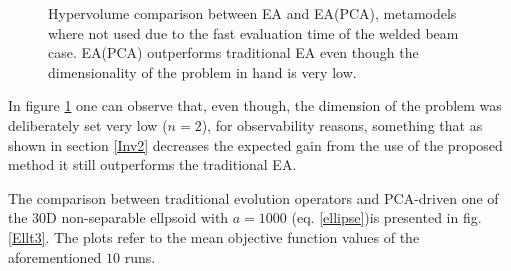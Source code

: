 \begin{figure}[h!]
\begin{minipage}[b]{1\linewidth}
 \centering
\end{minipage}
\caption{Hypervolume comparison between EA and EA(PCA), metamodels where not used due to the fast evaluation time of the welded beam case. EA(PCA) outperforms traditional EA even though the dimensionality of the problem in hand is very low.} 
\label{HypervolumeComparison}
\end{figure}

In figure \ref{HypervolumeComparison} one can observe that, even though, the dimension of the problem was deliberately set very low ($n=2$), for observability reasons, something that as shown in section \ref{Inv2} decreases the expected gain from the use of the proposed method it still outperforms the traditional EA.  

The comparison between traditional evolution operators and PCA-driven one of the 30D non-separable ellpsoid with $a=1000$ (eq. \ref{ellipse})is presented in fig. \ref{Ellt3}. The plots refer to the mean objective function values of the aforementioned $10$ runs. 

